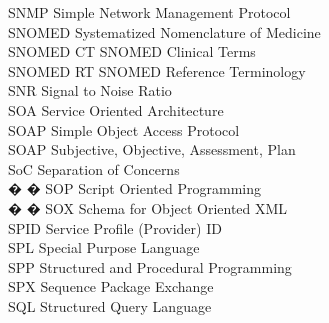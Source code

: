 \begin{tabbing}


    \>SNMP \>\>Simple Network Management Protocol\\

    \>SNOMED \>\>Systematized Nomenclature of Medicine\\

    \>SNOMED CT \>\>SNOMED Clinical Terms\\

    \>SNOMED RT \>\>SNOMED Reference Terminology\\

    \>SNR \>\>Signal to Noise Ratio\\

    \>SOA \>\>Service Oriented Architecture\\

    \>SOAP \>\>Simple Object Access Protocol\\

    \>SOAP \>\>Subjective, Objective, Assessment, Plan\\

    \>SoC \>\>Separation of Concerns\\


� � \>SOP \>\>Script Oriented Programming\\

� � \>SOX \>\>Schema for Object Oriented XML\\

    \>SPID \>\>Service Profile (Provider) ID\\

    \>SPL \>\>Special Purpose Language\\

    \>SPP \>\>Structured and Procedural Programming\\


    \>SPX \>\>Sequence Package Exchange\\

    \>SQL \>\>Structured Query Language\\



\end{tabbing}

